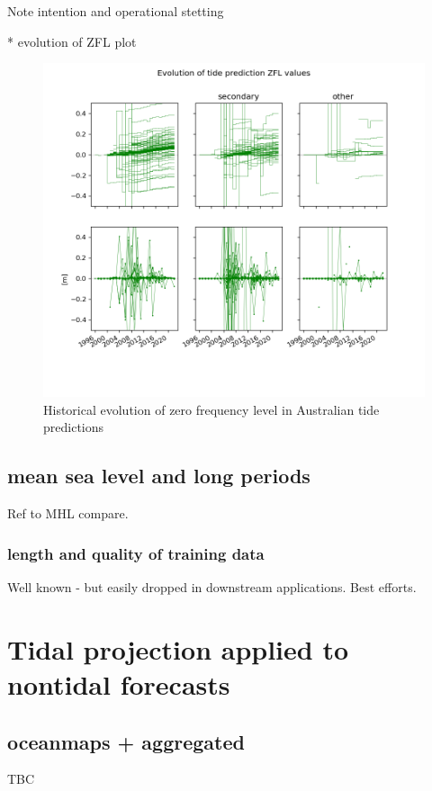 Note intention and operational stetting

* evolution of ZFL
plot


\begin{figure}[h]\centering
  \includegraphics[width=150mm]{figures/plots/tidal_z0_evolution.png}
  \caption{Historical evolution of zero frequency level in Australian tide predictions}
  \label{fig:tbc}
\end{figure}

\subsection{mean sea level and long periods}

Ref to MHL compare.

\subsubsection{length and quality of training data}

Well known - but easily dropped in downstream applications.
Best efforts.


\section{Tidal projection applied to nontidal forecasts}
\subsection{oceanmaps + aggregated}
TBC

